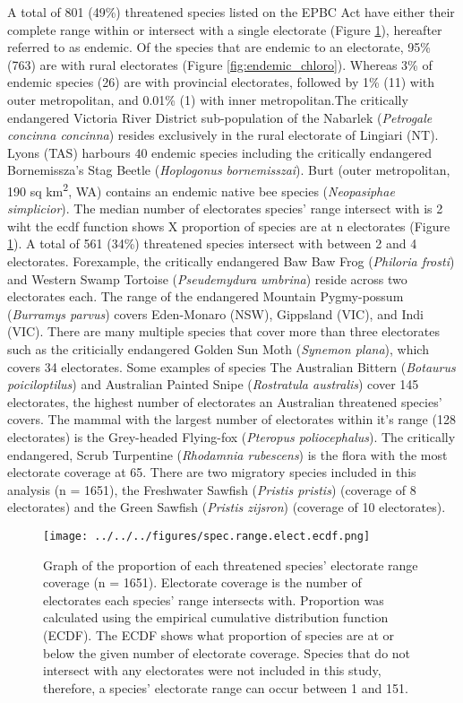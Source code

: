 \documentclass[a4paper,11pt]{article}
\begin{document}
A total of 801 (49\%) threatened species listed on the EPBC Act have either their complete range within or intersect with a single electorate (Figure \ref{fig:hist}), hereafter referred to as endemic. Of the species that are endemic to an electorate, 95\% (763) are with rural electorates (Figure \ref{fig:endemic_chloro}). Whereas 3\% of endemic species (26) are with provincial electorates, followed by 1\% (11) with outer metropolitan, and 0.01\% (1) with inner metropolitan.The critically endangered Victoria River District sub-population of the Nabarlek (\emph{Petrogale concinna concinna}) resides exclusively in the rural electorate of Lingiari (NT). Lyons (TAS) harbours 40 endemic species including the critically endangered Bornemissza's Stag Beetle (\emph{Hoplogonus bornemisszai}).  Burt (outer metropolitan, 190 sq km\textsuperscript{2}, WA) contains an endemic native bee species (\emph{Neopasiphae simplicior}). The median number of electorates species' range intersect with is 2 wiht the ecdf function shows X proportion of species are at n electorates (Figure \ref{fig:hist}). A total of 561 (34\%) threatened species intersect with between 2 and 4 electorates. Forexample, the critically endangered Baw Baw Frog (\emph{Philoria frosti}) and Western Swamp Tortoise (\emph{Pseudemydura umbrina}) reside across two electorates each. The range of the endangered Mountain Pygmy-possum (\emph{Burramys parvus}) covers Eden-Monaro (NSW), Gippsland (VIC), and Indi (VIC). There are many multiple species that cover more than three electorates such as the criticially endangered Golden Sun Moth (\emph{Synemon plana}), which covers 34 electorates. Some examples of species The Australian Bittern (\emph{Botaurus poiciloptilus}) and Australian Painted Snipe (\emph{Rostratula australis}) cover 145 electorates, the highest number of electorates an Australian threatened species' covers. The mammal with the largest number of electorates within it's range (128 electorates) is the Grey-headed Flying-fox (\emph{Pteropus poliocephalus}). The critically endangered, Scrub Turpentine (\emph{Rhodamnia rubescens}) is the flora with the most electorate coverage at 65. There are two migratory species included in this analysis (n = 1651), the Freshwater Sawfish (\emph{Pristis pristis}) (coverage of 8 electorates) and the Green Sawfish (\emph{Pristis zijsron}) (coverage of 10 electorates).


\begin{figure}[H]
	\centering
    \texttt{[image: ../../../figures/spec.range.elect.ecdf.png]}
    \caption{Graph of the proportion of each threatened species' electorate range coverage (n = 1651). Electorate coverage is the number of electorates each species' range intersects with. Proportion was calculated using the empirical cumulative distribution function (ECDF). The ECDF shows what proportion of species are at or below the given number of electorate coverage. Species that do not intersect with any electorates were not included in this study, therefore, a species' electorate range can occur between 1 and 151.}
    \label{fig:hist}
\end{figure}
\end{document}

